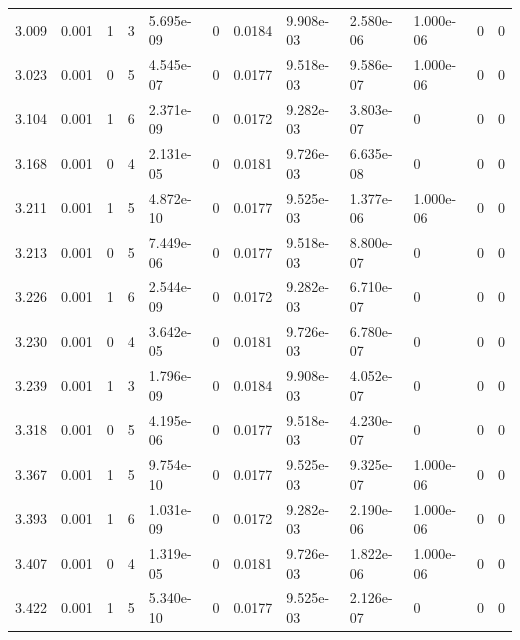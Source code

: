\documentclass[preview]{standalone}
\begin{document}
{{{\begin{tabular}{L{1.2cm}C{1.2cm} C{0.3cm}C{0.5cm} C{1.4cm}C{1.4cm} C{1.4cm}C{1.4cm} C{1.6cm}C{1.6cm} C{1.6cm}C{1.6cm}}
  3.009  &  0.001  & 1     &  3 &  5.695e-09  & 0  &  0.0184&   9.908e-03& 2.580e-06 & 1.000e-06   &  0 & 0  \\ 
  3.023  &  0.001  & 0     &  5 &  4.545e-07  & 0  &  0.0177&   9.518e-03& 9.586e-07 & 1.000e-06   &  0 & 0  \\ 
  3.104  &  0.001  & 1     &  6 &  2.371e-09  & 0  &  0.0172&   9.282e-03& 3.803e-07 & 0   &  0 & 0  \\ 
  3.168  &  0.001  & 0     &  4 &  2.131e-05  & 0  &  0.0181&   9.726e-03& 6.635e-08 & 0   &  0 & 0  \\ 
  3.211  &  0.001  & 1     &  5 &  4.872e-10  & 0  &  0.0177&   9.525e-03& 1.377e-06 & 1.000e-06   &  0 & 0  \\ 
  3.213  &  0.001  & 0     &  5 &  7.449e-06  & 0  &  0.0177&   9.518e-03& 8.800e-07 & 0   &  0 & 0  \\ 
  3.226  &  0.001  & 1     &  6 &  2.544e-09  & 0  &  0.0172&   9.282e-03& 6.710e-07 & 0   &  0 & 0  \\ 
  3.230  &  0.001  & 0     &  4 &  3.642e-05  & 0  &  0.0181&   9.726e-03& 6.780e-07 & 0   &  0 & 0  \\ 
  3.239  &  0.001  & 1     &  3 &  1.796e-09  & 0  &  0.0184&   9.908e-03& 4.052e-07 & 0   &  0 & 0  \\ 
  3.318  &  0.001  & 0     &  5 &  4.195e-06  & 0  &  0.0177&   9.518e-03& 4.230e-07 & 0   &  0 & 0  \\ 
  3.367  &  0.001  & 1     &  5 &  9.754e-10  & 0  &  0.0177&   9.525e-03& 9.325e-07 & 1.000e-06   &  0 & 0  \\ 
  3.393  &  0.001  & 1     &  6 &  1.031e-09  & 0  &  0.0172&   9.282e-03& 2.190e-06 & 1.000e-06   &  0 & 0  \\ 
  3.407  &  0.001  & 0     &  4 &  1.319e-05  & 0  &  0.0181&   9.726e-03& 1.822e-06 & 1.000e-06   &  0 & 0  \\ 
  3.422  &  0.001  & 1     &  5 &  5.340e-10  & 0  &  0.0177&   9.525e-03& 2.126e-07 & 0   &  0 & 0  \\ 
\hline 
\end{tabular} 

}}}
\end{document}
